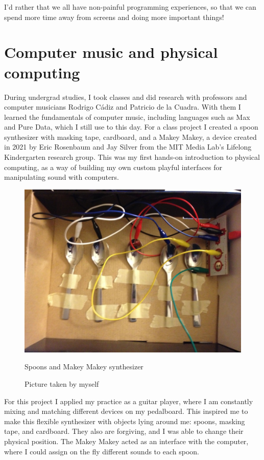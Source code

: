 I'd rather that we all have non-painful programming experiences, so that we can spend more time away from screens and doing more important things!

\section{Computer music and physical computing}

During undergrad studies, I took classes and did research with professors and computer musicians Rodrigo Cádiz and Patricio de la Cuadra. With them I learned the fundamentals of computer music, including languages such as Max and Pure Data, which I still use to this day. For a class project I created a spoon synthesizer with masking tape, cardboard, and a Makey Makey, a device created in 2021 by Eric Rosenbaum and Jay Silver from the MIT Media Lab's Lifelong Kindergarten research group. This was my first hands-on introduction to physical computing, as a way of building my own custom playful interfaces for manipulating sound with computers.
 
\begin{figure}[ht]
  \centering
  \includegraphics[width=0.75\linewidth,height=0.25\textheight,keepaspectratio]{images/makey-makey-spoons.jpg}
  \caption{Spoons and Makey Makey synthesizer}
  \caption*{Picture taken by myself}
  \label{fig:makey-makey-spoons}
\end{figure}

For this project I applied my practice as a guitar player, where I am constantly mixing and matching different devices on my pedalboard. This inspired me to make this flexible synthesizer with objects lying around me: spoons, masking tape, and cardboard. They also are forgiving, and I was able to change their physical position. The Makey Makey acted as an interface with the computer, where I could assign on the fly different sounds to each spoon.

